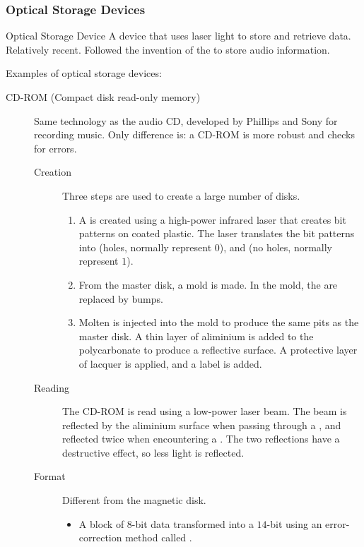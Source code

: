 \documentclass[\main/notes.tex]{subfiles}
\begin{document}
				\subsubsection{Optical Storage Devices}
					\begin{definition}{Optical Storage Device}
						A device that uses laser light to store and retrieve data. Relatively recent. Followed the invention of the  to store audio information. 
					\end{definition}
					Examples of optical storage devices:
					\begin{indentparagraph}
						\begin{description}
							\item[CD-ROM (Compact disk read-only memory)] Same technology as the audio CD, developed by Phillips and Sony for recording music. Only difference is: a CD-ROM is more robust and checks for errors.
								\begin{description}
									\item[Creation] Three steps are used to create a large number of disks.
										\begin{enumerate}[label=\alph*, nosep]
											\item A  is created using a high-power infrared laser that creates bit patterns on coated plastic. The laser translates the bit patterns into  (holes, normally represent $0$), and  (no holes, normally represent $1$).
											\item From the master disk, a mold is made. In the mold, the  are replaced by bumps.
											\item Molten  is injected into the mold to produce the same pits as the master disk. A thin layer of aliminium is added to the polycarbonate to produce a reflective surface. A protective layer of lacquer is applied, and a label is added. 
										\end{enumerate}
									\item[Reading] The CD-ROM is read using a low-power laser beam. The beam is reflected by the aliminium surface when passing through a , and reflected twice when encountering a . The two reflections have a destructive effect, so less light is reflected.
									\item[Format] Different from the magnetic disk.
										\begin{itemize}[nosep]
											\item A block of $8$-bit data transformed into a $14$-bit  using an error-correction method called .

\end{itemize}
\end{description}
\end{description}
\end{indentparagraph}
\end{document}
